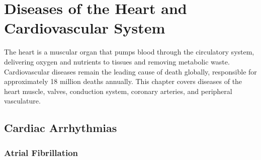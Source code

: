 \chapter{Diseases of the Heart and Cardiovascular System}
\label{ch:heart}
The heart is a muscular organ that pumps blood through the circulatory system, delivering oxygen and nutrients to tissues and removing metabolic waste. Cardiovascular diseases remain the leading cause of death globally, responsible for approximately 18 million deaths annually. This chapter covers diseases of the heart muscle, valves, conduction system, coronary arteries, and peripheral vasculature.

\section{Cardiac Arrhythmias}








\label{sec:Cardiac Arrhythmias}

\subsection{Atrial Fibrillation}
\label{sec:Atrial Fibrillation}

